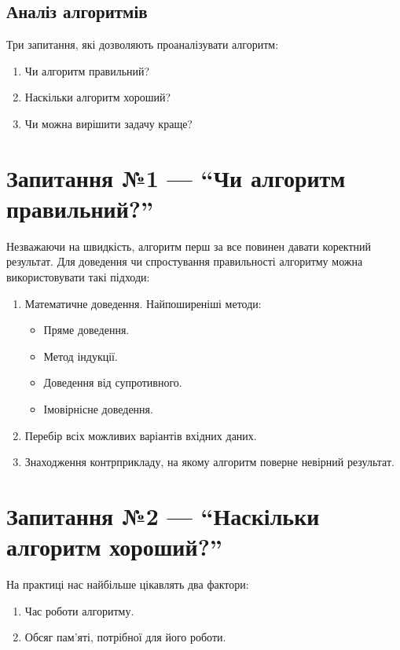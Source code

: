 \documentclass[12pt,a4paper]{report}
\begin{document}
\begin{minipage}{\linewidth}
\subsection*{Аналіз алгоритмів}
Три запитання, які дозволяють проаналізувати алгоритм:
\begin{enumerate}
    \item Чи алгоритм правильний?
    \item Наскільки алгоритм хороший?
    \item Чи можна вирішити задачу краще?
\end{enumerate}
\end{minipage}


\section{Запитання №1 --- ``Чи алгоритм правильний?''}
Незважаючи на швидкість, алгоритм перш за все повинен давати коректний результат.
Для доведення чи спростування правильності алгоритму можна використовувати такі підходи:
\begin{enumerate}
    \item Математичне доведення. Найпоширеніші методи:
        \begin{itemize}
            \item Пряме доведення.
            \item Метод індукції.
            \item Доведення від супротивного.
            \item Імовірнісне доведення.
        \end{itemize}
    \item Перебір всіх можливих варіантів вхідних даних.
    \item Знаходження контрприкладу, на якому алгоритм поверне невірний результат.
\end{enumerate}



\section{Запитання №2 --- ``Наскільки алгоритм хороший?''}
На практиці нас найбільше цікавлять два фактори:
\begin{enumerate}
    \item Час роботи алгоритму.
    \item Обсяг пам’яті, потрібної для його роботи.
\end{enumerate}
\end{document}
